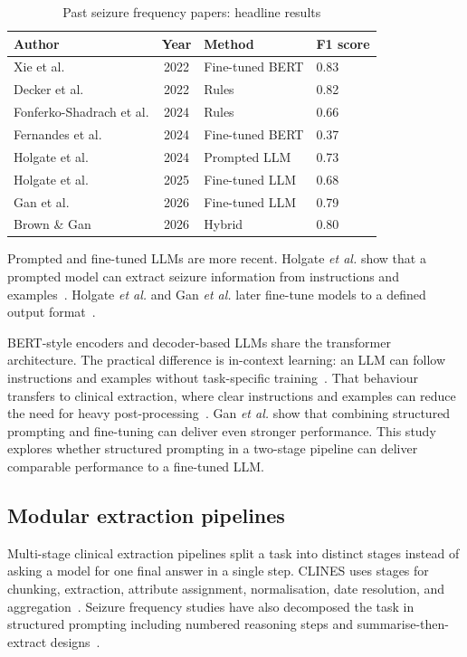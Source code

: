 \documentclass[conference]{IEEEtran}
\begin{document}
\begin{table}[!t]
\caption{Past seizure frequency papers: headline results}
\label{tab:historical}
\centering
\begin{tabularx}{\linewidth}{Ycll}
\toprule
\textbf{Author} & \textbf{Year} & \textbf{Method} & \textbf{F1 score} \\
\midrule
Xie et al. & 2022 & Fine-tuned BERT & 0.83 \\
Decker et al. & 2022 & Rules & 0.82 \\
Fonferko-Shadrach et al. & 2024 & Rules & 0.66 \\
Fernandes et al. & 2024 & Fine-tuned BERT & 0.37 \\
Holgate et al. & 2024 & Prompted LLM & 0.73 \\
Holgate et al. & 2025 & Fine-tuned LLM & 0.68 \\
Gan et al. & 2026 & Fine-tuned LLM & 0.79 \\
\midrule
Brown \& Gan & 2026 & Hybrid & 0.80 \\
\bottomrule
\end{tabularx}
\end{table}

Prompted and fine-tuned LLMs are more recent. 
Holgate \emph{et al.} show that a prompted model can 
extract seizure information from instructions and 
examples~\cite{b7}. Holgate \emph{et al.} 
and Gan \emph{et al.} later fine-tune models to a defined 
output format~\cite{b8,b5}. 

BERT-style encoders and decoder-based LLMs 
share the transformer architecture. The practical 
difference is in-context learning: an LLM can 
follow instructions and examples without 
task-specific training~\cite{b11}. That behaviour 
transfers to clinical extraction, where clear 
instructions and examples can reduce the need for 
heavy post-processing~\cite{b12}. Gan \emph{et al.}
show that combining structured prompting and 
fine-tuning can deliver even stronger performance. 
This study explores whether structured
prompting in a two-stage pipeline can deliver 
comparable performance to a fine-tuned LLM.

\subsection{Modular extraction pipelines}

Multi-stage clinical extraction pipelines split a task 
into distinct stages instead of asking a model for 
one final answer in a single step. CLINES uses 
stages for chunking, extraction, attribute assignment, 
normalisation, date resolution, and aggregation~\cite{b14}. 
Seizure frequency studies have also decomposed 
the task in structured prompting including numbered 
reasoning steps and summarise-then-extract 
designs~\cite{b7,b15}. 
\end{document}

